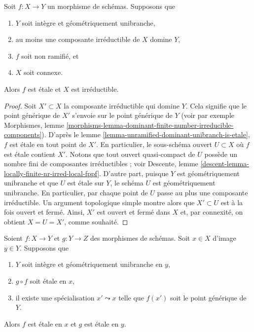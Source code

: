 \begin{lemma}
\label{lemma-global-unramified-dominant-unibranch-is-etale}
\begin{reference}
\cite[Exposé I, Corollaire 9.11]{SGA1}
\end{reference}
Soit $f : X \to Y$ un morphisme de schémas. Supposons que
\begin{enumerate}
\item $Y$ soit intègre et géométriquement unibranche,
\item au moins une composante irréductible de $X$ domine $Y$,
\item $f$ soit non ramifié, et
\item $X$ soit connexe.
\end{enumerate}
Alors $f$ est \'etale et $X$ est irréductible.
\end{lemma}

\begin{proof}
Soit $X' \subset X$ la composante irréductible qui domine $Y$.
Cela signifie que le point générique de $X'$ s'envoie sur le point générique de $Y$
(voir par exemple Morphismes, lemme
\ref{morphisms-lemma-dominant-finite-number-irreducible-components}).
D'après le lemme \ref{lemma-unramified-dominant-unibranch-is-etale},
$f$ est \'etale en tout point de $X'$. En particulier,
le sous-schéma ouvert $U \subset X$ où $f$ est \'etale contient $X'$.
Notons que tout ouvert quasi-compact de $U$ possède un nombre fini de composantes
irréductibles ; voir
Descente, lemme \ref{descent-lemma-locally-finite-nr-irred-local-fppf}.
D'autre part, puisque $Y$ est géométriquement unibranche et que $U$ est \'etale
sur $Y$, le schéma $U$ est géométriquement unibranche. En particulier, par
chaque point de $U$ passe au plus une composante irréductible.
Un argument topologique simple montre alors que $X' \subset U$
est à la fois ouvert et fermé. Ainsi, $X'$ est ouvert et fermé dans $X$ et, par
connexité, on obtient $X = U = X'$, comme souhaité.
\end{proof}

\begin{lemma}
\label{lemma-weird-permanence-etale}
Soient $f : X \to Y$ et $g : Y \to Z$ des morphismes de schémas.
Soit $x \in X$ d'image $y \in Y$. Supposons que
\begin{enumerate}
\item $Y$ soit intègre et géométriquement unibranche en $y$,
\item $g \circ f$ soit \'etale en $x$,
\item il existe une spécialisation $x' \leadsto x$ telle que $f(x')$
soit le point générique de $Y$.
\end{enumerate}
Alors $f$ est \'etale en $x$ et $g$ est \'etale en $y$.
\end{lemma}

